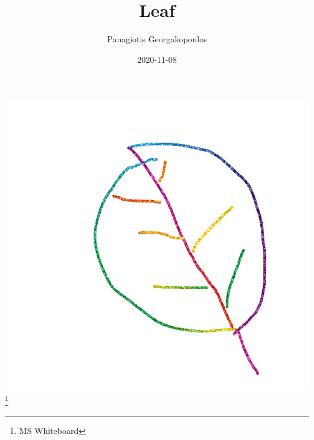 \documentclass[12pt, letter]{article}
\title{Leaf}
\author{Panagiotis Georgakopoulos}
\date{2020-11-08}
\begin{document}
\begin{titlepage}
\maketitle
\end{titlepage}


\includegraphics[width=\textwidth,height=\textheight,keepaspectratio]{leaf-ms-whiteboard.png}
\footnote*{MS Whiteboard}
\newpage
\end{document}
